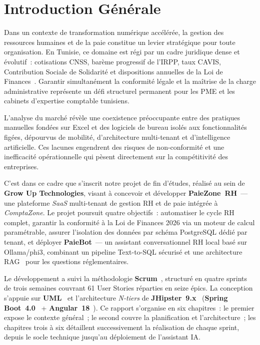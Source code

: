 \chapter*{Introduction Générale}

Dans un contexte de transformation numérique accélérée, la gestion des ressources
humaines et de la paie constitue un levier stratégique pour toute organisation. En
Tunisie, ce domaine est régi par un cadre juridique dense et évolutif~: cotisations
CNSS, barème progressif de l'IRPP, taux CAVIS, Contribution Sociale de Solidarité et
dispositions annuelles de la Loi de Finances~\cite{loifinance}. Garantir simultanément
la conformité légale et la maîtrise de la charge administrative représente un défi
structurel permanent pour les PME et les cabinets d'expertise comptable tunisiens.

L'analyse du marché révèle une coexistence préoccupante entre des pratiques manuelles
fondées sur Excel et des logiciels de bureau isolés aux fonctionnalités figées, dépourvus
de mobilité, d'architecture multi-tenant et d'intelligence artificielle. Ces lacunes
engendrent des risques de non-conformité et une inefficacité opérationnelle qui pèsent
directement sur la compétitivité des entreprises.

C'est dans ce cadre que s'inscrit notre projet de fin d'études, réalisé au sein de
\textbf{Grow Up Technologies}, visant à concevoir et développer \textbf{PaieZone~RH}~---
une plateforme \textit{SaaS} multi-tenant de gestion RH et de paie intégrée à
\textit{ComptaZone}. Le projet poursuit quatre objectifs~: automatiser le cycle RH
complet, garantir la conformité à la Loi de Finances 2026 via un moteur de calcul
paramétrable, assurer l'isolation des données par schéma PostgreSQL dédié par tenant,
et déployer \textbf{PaieBot}~--- un assistant conversationnel RH local basé sur
Ollama/phi3, combinant un pipeline Text-to-SQL sécurisé et une architecture
RAG~\cite{rag} pour les questions réglementaires.

Le développement a suivi la méthodologie \textbf{Scrum}~\cite{scrum}, structuré en
quatre sprints de trois semaines couvrant 61 User Stories réparties en seize épics.
La conception s'appuie sur \textbf{UML}~\cite{uml} et l'architecture \textit{N-tiers}
de \textbf{JHipster~9.x}~\cite{jhipster} (\textbf{Spring Boot~4.0}~\cite{springboot}
+ \textbf{Angular~18}~\cite{angular}). Ce rapport s'organise en six chapitres~:
le premier expose le contexte général~; le second couvre la planification et
l'architecture~; les chapitres trois à six détaillent successivement la réalisation
de chaque sprint, depuis le socle technique jusqu'au déploiement de l'assistant IA.
